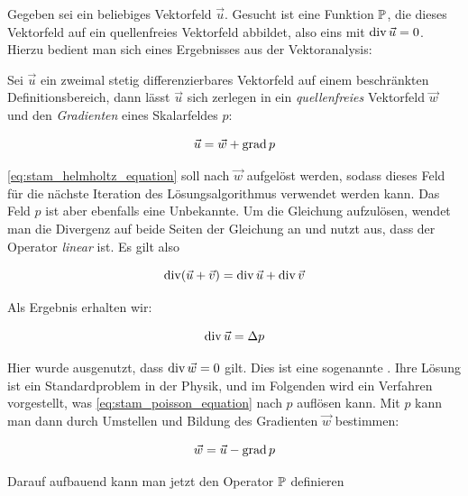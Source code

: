 Gegeben sei ein beliebiges Vektorfeld $\vec{u}$. Gesucht ist eine Funktion
$\mathbb{P}$, die dieses Vektorfeld auf ein quellenfreies Vektorfeld
abbildet, also eins mit $\operatorname*{div} \vec{u} = 0$. Hierzu bedient man sich eines
Ergebnisses aus der Vektoranalysis:

\begin{PimiddySatz}
Sei $\vec{u}$ ein zweimal stetig differenzierbares Vektorfeld auf einem
beschränkten Definitionsbereich, dann lässt $\vec{u}$ sich zerlegen in
ein \emph{quellenfreies} Vektorfeld $\vec{w}$ und den \emph{Gradienten}
eines Skalarfeldes $p$:

\begin{equation}
\label{eq:stam_helmholtz_equation}
\vec{u} = \vec{w} + \operatorname*{grad} p
\end{equation}
\end{PimiddySatz}

\autoref{eq:stam_helmholtz_equation} soll nach $\vec{w}$ aufgelöst werden, sodass
dieses Feld für die nächste Iteration des Lösungsalgorithmus verwendet werden
kann. Das Feld $p$ ist aber ebenfalls eine Unbekannte. Um die Gleichung
aufzulösen, wendet man die Divergenz auf beide Seiten der Gleichung an und nutzt
aus, dass der Operator \emph{linear} ist. Es gilt also

\begin{equation}
\operatorname*{div} (\vec{u} + \vec{v}) = \operatorname*{div} \vec{u} + \operatorname*{div} \vec{v}
\end{equation}

Als Ergebnis erhalten wir:

\begin{equation}
\label{eq:stam_poisson_equation}
\operatorname*{div} \vec{u} = \Delta p
\end{equation}

Hier wurde ausgenutzt, dass $\operatorname*{div} \vec{w} = 0$ gilt. Dies ist eine
sogenannte . Ihre Lösung ist ein
Standardproblem in der Physik, und im Folgenden wird ein Verfahren vorgestellt,
was \autoref{eq:stam_poisson_equation} nach $p$ auflösen kann. Mit $p$ kann man
dann durch Umstellen und Bildung des Gradienten $\vec{w}$ bestimmen:

\begin{equation}
\vec{w} = \vec{u} - \operatorname*{grad} p
\end{equation}

Darauf aufbauend kann man jetzt den Operator $\mathbb{P}$ definieren

